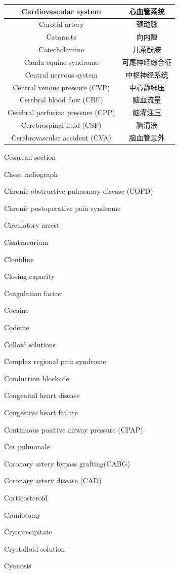 \documentclass[10pt]{article}
\begin{document}
\begin{center}
\begin{tabular}{|c|c|}
\hline
Cardiovascular system & 心血管系统 \\
\hline
Carotid artery & 颈动脉 \\
\hline
Cataracts & 向内障 \\
\hline
Catecholamine & 儿茶酚胺 \\
\hline
Cauda equine syndrome & 可尾神经综合征 \\
\hline
Central nervous system & 中枢神经系统 \\
\hline
Central venous pressure (CVP) & 中心静脉压 \\
\hline
Cerebral blood flow (CBF) & 脑血流量 \\
\hline
Cerebral perfusion pressure (CPP) & 脑灌注压 \\
\hline
Cerebrospinal fluid (CSF) & 脑清液 \\
\hline
Cerebrovascular accident (CVA) & 脑血管意外 \\
\hline
\end{tabular}
\end{center}

Cesarean section

Chest radiograph

Chronic obstructive pulmonary disease (COPD)

Chronic postoperative pain syndrome

Circulatory arrest

Cisatracurium

Clonidine

Closing capacity

Coagulation factor

Cocaine

Codeine

Colloid solutions

Complex regional pain syndrome

Conduction blockade

Congenital heart disease

Congestive heart failure

Continuous positive airway pressure (CPAP)

Cor pulmonale

Coronary artery bypass grafting(CABG)

Coronary artery disease (CAD)

Corticosteroid

Craniotomy

Cryoprecipitate

Crystalloid solution

Cyanosis
\end{document}
